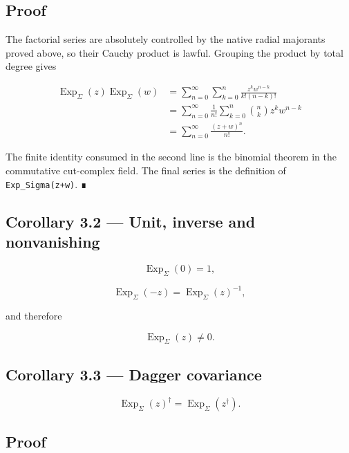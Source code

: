 \hypertarget{proof-1}{%
\subsection{Proof}\label{proof-1}}

The factorial series are absolutely controlled by the native radial majorants
proved above, so their Cauchy product is lawful. Grouping the product by total
degree gives

\[
\begin{aligned}
\operatorname{Exp}_\Sigma(z)
\operatorname{Exp}_\Sigma(w)
&=
\sum_{n=0}^{\infty}
\sum_{k=0}^{n}
\frac{z^kw^{n-k}}{k!(n-k)!}\\
&=
\sum_{n=0}^{\infty}
\frac{1}{n!}
\sum_{k=0}^{n}
\binom{n}{k}z^kw^{n-k}\\
&=
\sum_{n=0}^{\infty}\frac{(z+w)^n}{n!}.
\end{aligned}
\]

The finite identity consumed in the second line is the binomial theorem in the
commutative cut-complex field. The final series is the definition of
\texttt{Exp\_Sigma(z+w)}. ∎

\hypertarget{corollary-3.2-unit-inverse-and-nonvanishing}{%
\subsection{Corollary 3.2 --- Unit, inverse and nonvanishing}\label{corollary-3.2-unit-inverse-and-nonvanishing}}

\[
\operatorname{Exp}_\Sigma(0)=1,
\]

\[
\operatorname{Exp}_\Sigma(-z)
=
\operatorname{Exp}_\Sigma(z)^{-1},
\]

and therefore

\[
\operatorname{Exp}_\Sigma(z)\ne0.
\]

\hypertarget{corollary-3.3-dagger-covariance}{%
\subsection{Corollary 3.3 --- Dagger covariance}\label{corollary-3.3-dagger-covariance}}

\[
\boxed{
\operatorname{Exp}_\Sigma(z)^\dagger
=
\operatorname{Exp}_\Sigma(z^\dagger).
}
\]

\hypertarget{proof-2}{%
\subsection{Proof}\label{proof-2}}

